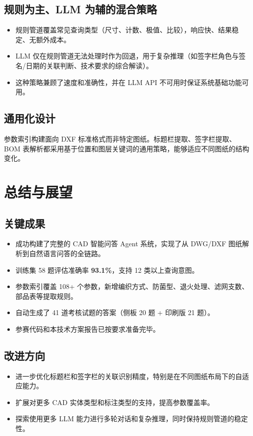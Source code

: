 \documentclass[11pt,a4paper]{article}
\begin{document}
\subsection{规则为主、LLM 为辅的混合策略}

\begin{itemize}[nosep]
  \item 规则管道覆盖常见查询类型（尺寸、计数、极值、比较），响应快、结果稳定、无额外成本。
  \item LLM 仅在规则管道无法处理时作为回退，用于复杂推理（如签字栏角色与签名/日期的关联判断、技术要求的综合解读）。
  \item 这种策略兼顾了速度和准确性，并在 LLM API 不可用时保证系统基础功能可用。
\end{itemize}

\subsection{通用化设计}

参数索引构建面向 DXF 标准格式而非特定图纸。标题栏提取、签字栏提取、BOM 表解析都采用基于位置和图层关键词的通用策略，能够适应不同图纸的结构变化。

\section{总结与展望}

\subsection{关键成果}

\begin{itemize}[nosep]
  \item 成功构建了完整的 CAD 智能问答 Agent 系统，实现了从 DWG/DXF 图纸解析到自然语言问答的全链路。
  \item 训练集 58 题评估准确率 \textbf{93.1\%}，支持 12 类以上查询意图。
  \item 参数索引覆盖 108+ 个参数，新增编织方式、防菌型、退火处理、滤网支数、部品表等提取规则。
	  \item 自动生成了 41 道考核试题的答案（侧板 20 题 + 印刷版 21 题）。
  \item 参赛代码和本技术方案报告已按要求准备完毕。
\end{itemize}

\subsection{改进方向}

\begin{itemize}[nosep]
  \item 进一步优化标题栏和签字栏的关联识别精度，特别是在不同图纸布局下的自适应能力。
  \item 扩展对更多 CAD 实体类型和标注类型的支持，提高参数覆盖率。
  \item 探索使用更多 LLM 能力进行多轮对话和复杂推理，同时保持规则管道的稳定性。
\end{itemize}
\end{document}
